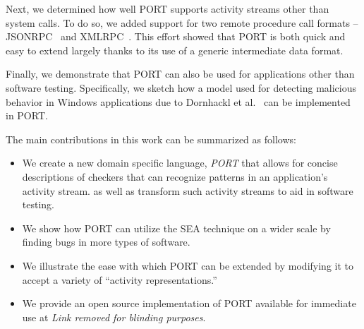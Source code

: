 Next, we
determined how well PORT
supports activity streams
other than system calls.
To do so, we 
added support for two remote procedure call formats --
JSONRPC~\cite{jsonspec} and XMLRPC~\cite{xmlspec}.
This effort
showed that PORT is both quick and easy to extend largely thanks to its
use of a generic intermediate data format.

Finally, we demonstrate that PORT can also be used for applications other than software testing.
Specifically, we sketch how a model used for
detecting malicious behavior in Windows applications due to Dornhackl et al.~\cite{Dornhackl2014} can be implemented in PORT.


The main contributions in this work can be summarized as follows:

\begin{itemize}

\item We create a new domain specific language, {\em PORT}
  that allows for concise descriptions of checkers that can recognize patterns in
  an application's activity stream. as well as transform such activity streams to aid in software testing.

\item We show how PORT can utilize the SEA technique on a wider scale by finding bugs in more types of software.

\item We illustrate the ease with which PORT can be extended by modifying
  it to accept a variety of ``activity representations.''
  
\item We provide an open source implementation of PORT available for immediate use
at \textit{Link removed for blinding purposes}.

\end{itemize}


